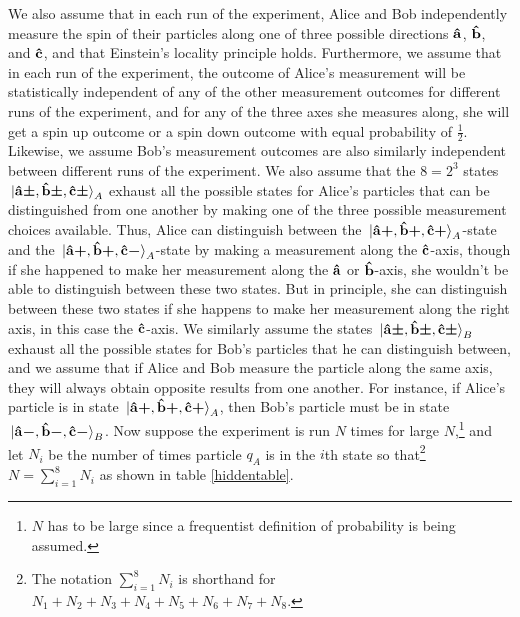 We also assume that in each run of the experiment, Alice and Bob independently measure the spin of their particles along one of three possible directions $\vb{\hat{{a}}}$, $\vb{\hat{{b}}}$, and $\vb{\hat{{c}}}$, and that Einstein's locality principle holds. Furthermore, we assume that in each run of the experiment, the outcome of Alice's measurement will be statistically independent of any of the other measurement outcomes for different runs of the experiment, and for any of the three axes she measures along, she will get a spin up outcome or a spin down outcome with equal probability of $\frac{1}{2}.$ Likewise, we assume Bob's measurement outcomes are also similarly independent between different runs of the experiment. We also assume that the $8=2^3$ states $\ket*{\vb{\hat{{a}}}\bm{\pm},\vb{\hat{{b}}}\bm{\pm},\vb{\hat{{c}}}\bm{\pm}}_A$ exhaust all the possible states for Alice's particles that can be distinguished from one another by making one of the three possible measurement choices available. Thus, Alice can distinguish between the $\ket*{\vb{\hat{{a}}}\bm{+},\vb{\hat{{b}}}\bm{+},\vb{\hat{{c}}}\bm{+}}_A$-state and the $\ket*{\vb{\hat{{a}}}\bm{+},\vb{\hat{{b}}}\bm{+},\vb{\hat{{c}}}\bm{-}}_A$-state by making a measurement along the $\vb{\hat{{c}}}$-axis, though if she happened to make her measurement along the $\vb{\hat{{a}}}$ or $\vb{\hat{{b}}}$-axis, she wouldn't be able to distinguish between these two states. But in principle, she can distinguish between these two states if she happens to make her measurement along the right axis, in this case the $\vb{\hat{{c}}}$-axis. We similarly assume the states $\ket*{\vb{\hat{{a}}}\bm{\pm},\vb{\hat{{b}}}\bm{\pm},\vb{\hat{{c}}}\bm{\pm}}_B$  exhaust all the possible states for Bob's particles that he can distinguish between, and we assume that if Alice and Bob measure the particle along the same axis, they will always obtain opposite results from one another. For instance, if Alice's particle is in state $\ket*{\vb{\hat{{a}}}\bm{+},\vb{\hat{{b}}}\bm{+},\vb{\hat{{c}}}\bm{+}}_A$, then Bob's particle must be in state $\ket*{\vb{\hat{{a}}}\bm{-},\vb{\hat{{b}}}\bm{-},\vb{\hat{{c}}}\bm{-}}_B$. Now suppose the experiment is run $N$ times for large $N$,\footnote{$N$ has to be large since a frequentist definition of probability is being assumed.} and let $N_i$ be the number of times particle $q_A$ is in the $i$th state so that\footnote{The notation $\sum_{i=1}^8 N_i$ is shorthand for $N_1+N_2+N_3+N_4+N_5+N_6+N_7+N_8$.} $N=\sum_{i=1}^8 N_i$ as shown in table \ref{hiddentable}.
      

